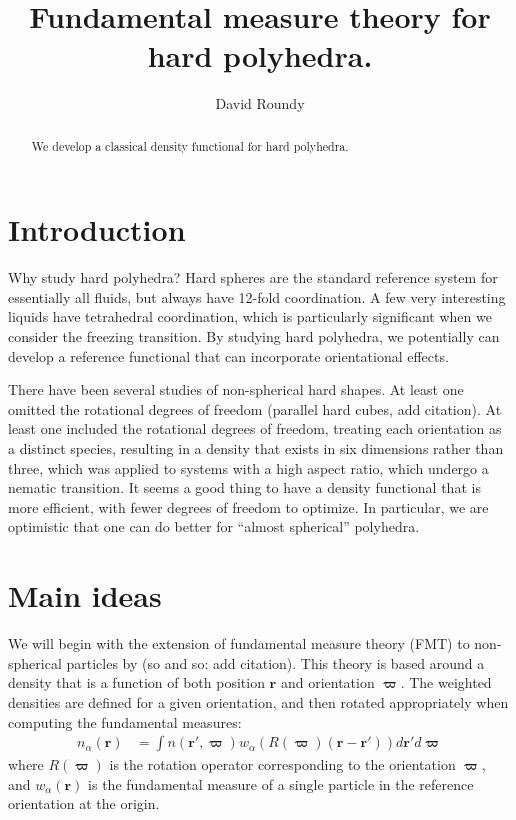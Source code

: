\documentclass[letterpaper,twocolumn,amsmath,amssymb,pre]{revtex4-1}
\begin{document}
\title{Fundamental measure theory for hard polyhedra.}

\author{David Roundy}
\begin{abstract}
  We develop a classical density functional for hard polyhedra.
\end{abstract}

\maketitle


\section{Introduction}

Why study hard polyhedra? Hard spheres are the standard reference
system for essentially all fluids, but always have 12-fold
coordination.  A few very interesting liquids have tetrahedral
coordination, which is particularly significant when we consider the
freezing transition.  By studying hard polyhedra, we potentially can
develop a reference functional that can incorporate orientational
effects.

There have been several studies of non-spherical hard shapes.  At
least one omitted the rotational degrees of freedom (parallel hard
cubes, add citation).  At least one included the rotational degrees of
freedom, treating each orientation as a distinct species, resulting in
a density that exists in six dimensions rather than three, which was
applied to systems with a high aspect ratio, which undergo a nematic
transition.  It seems a good thing to have a density functional that
is more efficient, with fewer degrees of freedom to optimize.  In
particular, we are optimistic that one can do better for ``almost
spherical'' polyhedra.

\section{Main ideas}

\newcommand\rr{\mathbf{r}}
\newcommand\rhat{\mathbf{\hat{r}}}
\newcommand\rot{\mathbf{\varpi}}

We will begin with the extension of fundamental measure theory (FMT)
to non-spherical particles by (so and so: add citation).  This theory
is based around a density that is a function of both position $\rr$
and orientation $\rot$.  The weighted densities are defined for a
given orientation, and then rotated appropriately when computing the
fundamental measures:
\begin{align}
  n_\alpha(\rr) &= \int n(\rr',\rot) w_\alpha(R(\rot)(\rr-\rr')) d\rr' d\rot
\end{align}
where $R(\rot)$ is the rotation operator corresponding to the
orientation $\rot$, and $w_\alpha(\rr)$ is the fundamental measure of
a single particle in the reference orientation at the origin.
\end{document}
